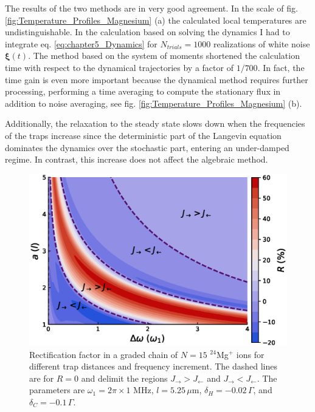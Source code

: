 The results of the two methods are in very good agreement. In the scale of fig. \ref{fig:Temperature_Profiles_Magnesium} (a)
the calculated local temperatures are undistinguishable. In the calculation based on solving the dynamics I had to integrate eq. \eqref{eq:chapter5_Dynamics} for $N_{trials} = 1000$ realizations of white noise $\bm{\xi}(t)$. The method based on the system of moments
shortened the calculation time with respect to the dynamical trajectories   by a factor of $1/700$. In fact, the time gain is even more important because
the dynamical method requires further processing, performing a time averaging to compute the stationary flux in addition to noise averaging, see fig.  \ref{fig:Temperature_Profiles_Magnesium} (b).


Additionally, the relaxation to the steady state slows down when the frequencies of the traps increase since the deterministic part of the Langevin equation dominates the dynamics over the stochastic part, entering an under-damped regime. In contrast, this increase does not affect the
algebraic method.
\begin{figure}
  \center
  \includegraphics[width=0.75\linewidth]{Figures/Graded_24Mg_Rectification_VS_Gradient_and_lattConstant.eps}
  \caption{ Rectification factor in a graded chain of $N=15$ $^{24}$Mg$^+$ ions for different trap distances and frequency increment. The dashed lines are for $R = 0$ and delimit the regions $J_\rightarrow > J_\leftarrow$ and $J_\rightarrow < J_\leftarrow$. The parameters  are $\omega_1 = 2 \pi \times 1$ MHz, $l = 5.25\,\mu$m, $\delta_H = -0.02 \,\Gamma$, and $\delta_C = -0.1 \, \Gamma$.}
  \label{fig:Graded_24Mg_Rectification_VS_Gradient_and_lattConstant}
\end{figure}
%
%
%
%
